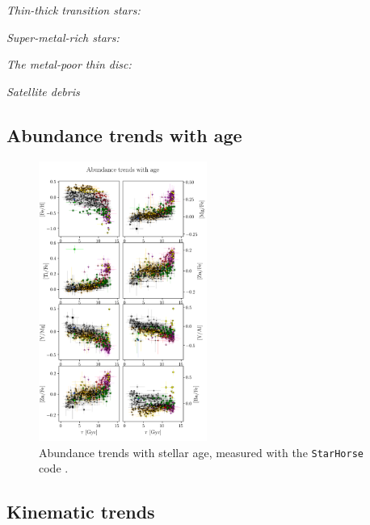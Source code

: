 \documentclass{aa}  %
\begin{document}
{\it Thin-thick transition stars:} 

{\it Super-metal-rich stars:} 

{\it The metal-poor thin disc:} 

{\it Satellite debris} 

\subsection{Abundance trends with age}

\begin{figure}\centering
 \includegraphics[width=0.49\textwidth]{im/harps_tsne-age-abundsplot_teffcut.png}
\caption{Abundance trends with stellar age, measured with the \texttt{StarHorse} code \citep{Queiroz2017}.}
\label{harps2}
\end{figure}


\subsection{Kinematic trends}
\end{document}
